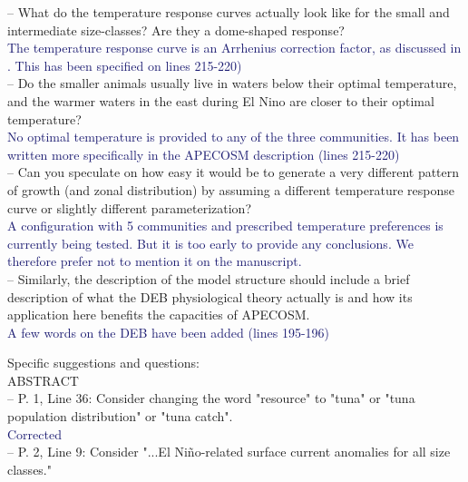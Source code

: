 \documentclass[12pt]{article}
\newcommand{\resp}[1]{\textcolor{MidnightBlue}{#1}}
\begin{document}
-- What do the temperature response curves actually look like for the small and intermediate size-classes? Are they a dome-shaped response?\\

\resp{The temperature response curve is an Arrhenius correction factor, as discussed in \cite{mauryModelingEnvironmentalEffects2007, mauryIndividualsPopulationsCommunities2013}. This has been specified on lines 215-220)} \\

-- Do the smaller animals usually live in waters below their optimal temperature, and the warmer waters in the east during El Nino are closer to their optimal temperature?\\

\resp{No optimal temperature is provided to any of the three communities. It has been written more specifically in the APECOSM description (lines 215-220)}\\

-- Can you speculate on how easy it would be to generate a very different pattern of growth (and zonal distribution) by assuming a different temperature response curve or slightly different parameterization?\\

\resp{A configuration with 5 communities and prescribed temperature preferences is currently being tested. But it is too early to provide any conclusions. We therefore prefer not to mention it on the manuscript.} \\

-- Similarly, the description of the model structure should include a brief description of what the DEB physiological theory actually is and how its application here benefits the capacities of APECOSM.\\

\resp{A few words on the DEB have been added (lines 195-196)}

Specific suggestions and questions:\\

ABSTRACT\\

-- P. 1, Line 36: Consider changing the word "resource" to "tuna" or "tuna population distribution" or "tuna catch".\\

\resp{Corrected} \\

-- P. 2, Line 9: Consider "...El Niño-related surface current anomalies for all size classes."\\
\end{document}
